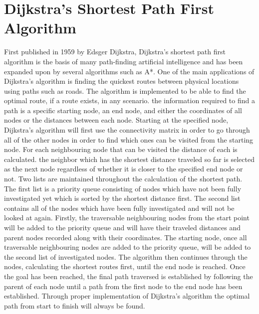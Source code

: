 \documentclass[12pt, a4paper]{article}
\title{\mytitle}
\author{\myauthor\hspace{1em}\\\contact\\Edinburgh Napier University\hspace{0.5em}-\hspace{0.5em}\mymodule}
\date{}
\begin{document}
    \maketitle


\section{Dijkstra's Shortest Path First Algorithm}
    First published in 1959 by Edsger Dijkstra, Dijkstra's shortest path first algorithm is the basis of many path-finding artificial intelligence and has been expanded upon by several algorithms such as A*. One of the main applications of Dijkstra's algorithm is finding the quickest routes between physical locations using paths such as roads. The algorithm is implemented to be able to find the optimal route, if a route exists, in any scenario. the information required to find a path is a specific starting node, an end node, and either the coordinates of all nodes or the distances between each node. Starting at the specified node, Dijkstra's algorithm will first use the connectivity matrix in order to go through all of the other nodes in order to find which ones can be visited from the starting node. For each neighbouring node that can be visited the distance of each is calculated. the neighbor which has the shortest distance traveled so far is selected as the next node regardless of whether it is closer to the specified end node or not. Two lists are maintained throughout the calculation of the shortest path. The first list is a priority queue consisting of nodes which have not been fully investigated yet which is sorted by the shortest distance first. The second list contains all of the nodes which have been fully investigated and will not be looked at again. Firstly, the traversable neighbouring nodes from the start point will be added to the priority queue and will have their traveled distances and parent nodes recorded along with their coordinates. The starting node, once all traversable neighbouring nodes are added to the priority queue, will be added to the second list of investigated nodes. The algorithm then continues through the nodes, calculating the shortest routes first, until the end node is reached. Once the goal has been reached, the final path traversed is established by following the parent of each node until a path from the first node to the end node has been established. Through proper implementation of Dijkstra's algorithm the optimal path from start to finish will always be found.
    
\end{document}

